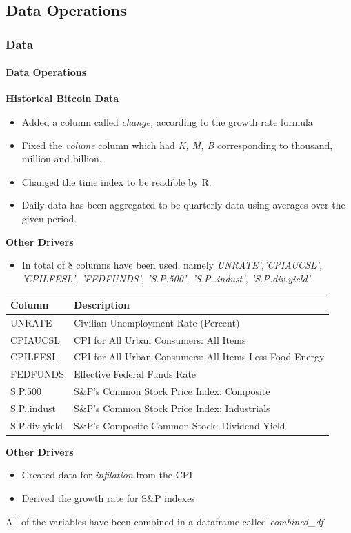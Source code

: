 \documentclass{beamer}
\begin{document}
	\subsection{Data Operations}	
	\begin{frame}
	\frametitle{Data}
		\framesubtitle{Data Operations}
					\textbf{Historical Bitcoin Data}
					\begin{itemize}
						\item Added a column called \emph{change,} according to the growth rate formula
						\item Fixed the \emph{volume} column which had \emph{K, M, B} corresponding to thousand, million and billion.
						\item Changed the time index to be readible by R.
						\item Daily data has been aggregated to be quarterly data using averages over the given period.
					\end{itemize}
	\end{frame}
	\begin{frame}
		\textbf{Other Drivers}
			\begin{itemize}
			\item In total of 8 columns have been used, namely \emph{UNRATE','CPIAUCSL', 'CPILFESL', 'FEDFUNDS', 'S.P.500', 'S.P..indust', 'S.P.div.yield'}
			\end{itemize}
		{\scriptsize
		\begin{tabular}{|l|l|} \hline
			Column & Description \\ \hline
			UNRATE & Civilian Unemployment Rate (Percent) \\ 
			CPIAUCSL & CPI for All Urban Consumers: All Items \\
			CPILFESL & CPI for All Urban Consumers: All Items Less Food Energy \\
			FEDFUNDS & Effective Federal Funds Rate\\
			S.P.500 & S\&P’s Common Stock Price Index: Composite\\
			S.P..indust & S\&P’s Common Stock Price Index: Industrials\\
			S.P.div.yield & S\&P’s Composite Common Stock: Dividend Yield\\ \hline
		\end{tabular}}		
	\end{frame}
	\begin{frame}
		\textbf{Other Drivers}
		\begin{itemize}
			\item Created data for \emph{infilation} from the CPI
			\item Derived the growth rate for S\&P indexes
		\end{itemize}
		All of the variables have been combined in a dataframe called \emph{combined\_df}
	\end{frame}
\end{document}
